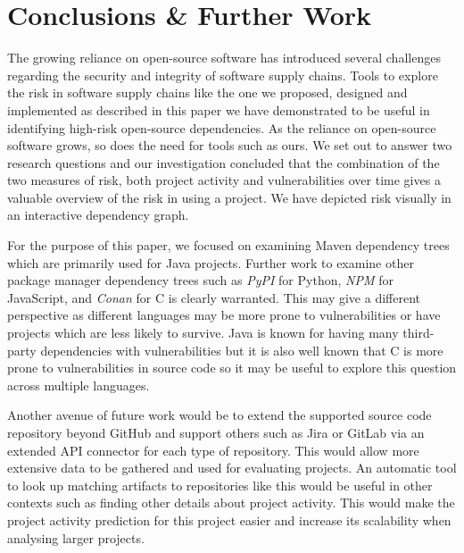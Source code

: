 \documentclass[conference]{IEEEtran}
\begin{document}
\section{Conclusions \& Further Work}
The growing reliance on open-source software \cite{noauthor_cisa_2023} has introduced several challenges regarding the security and integrity of software supply chains. Tools to explore the risk in software supply chains like the one we proposed, designed and implemented as described in this paper we have demonstrated to be useful in identifying high-risk open-source dependencies. As the reliance on open-source software grows, so does the need for tools such as ours. We set out to answer two research questions and our investigation concluded that the combination of the two measures of risk, both project activity and vulnerabilities over time gives a valuable overview of the risk in using a project. We have depicted risk visually in an interactive dependency graph. 

For the purpose of this paper, we focused on examining Maven dependency trees which are primarily used for Java projects. Further work to examine other package manager dependency trees such as \textit{PyPI} for Python, \textit{NPM} for JavaScript, and \textit{Conan} for C is clearly warranted. This may give a different perspective as different languages may be more prone to vulnerabilities or have projects which are less likely to survive. Java is known for having many third-party dependencies with vulnerabilities but it is also well known that C is more prone to vulnerabilities in source code so it may be useful to explore this question across multiple languages. 

Another avenue of future work would be to extend the supported source code repository beyond GitHub and support others such as Jira or GitLab via an extended API connector for each type of repository. This would allow more extensive data to be gathered and used for evaluating projects. An automatic tool to look up matching artifacts to repositories like this would be useful in other contexts such as finding other details about project activity. This would make the project activity prediction for this project easier and increase its scalability when analysing larger projects. 
\end{document}
